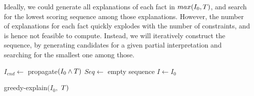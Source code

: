 Ideally, we could generate all explanations of each fact in $max(I_0,T)$, and search for the lowest scoring sequence among those explanations. 
However, the number of explanations for each fact quickly explodes with the number of constraints, and is hence not feasible to compute.
Instead, we will iteratively construct the sequence, by generating candidates for a given partial interpretation and searching for the smallest one among those.

\begin{algorithm}[ht]
    $I_{end} \gets$ propagate$(I_0\land T)$\;
    $Seq \gets$ empty sequence\;
    $I \gets I_0$\;
    \caption{greedy-explain$(I_0,$ $T)$}
    \label{alg:nested-main}
  \end{algorithm}